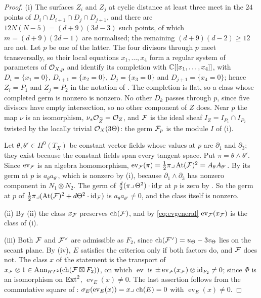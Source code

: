 \begin{proof}
(i) The surfaces $Z_{i}$ and $Z_{j}$ at cyclic distance at least three meet
in the $24$ points of $D_{i}\cap D_{i+1}\cap D_{j}\cap D_{j+1}$, and there are
$12N(N-5)=(d+9)(3d-3)$ such points, of which $m=(d+9)(2d-1)$ are normalised;
the remaining $(d+9)(d-2)\ge12$ are not. Let $p$ be one of the latter. The
four divisors through $p$ meet transversally, so their local equations
$x_{1},\dots,x_{4}$ form a regular system of parameters of $\mathcal{O}_{X,p}$ and
identify its completion with $\mathbb{C}[[x_{1},\dots,x_{4}]]$, with
$D_{i}=\{x_{1}=0\}$, $D_{i+1}=\{x_{2}=0\}$, $D_{j}=\{x_{3}=0\}$ and
$D_{j+1}=\{x_{4}=0\}$; hence $Z_{i}=P_{1}$ and $Z_{j}=P_{2}$ in the
notation of . The completion is flat, so a class
whose completed germ is nonzero is nonzero. No other $D_{k}$ passes through
$p$, since five divisors have empty intersection, so no other component of
$Z$ does. Near $p$ the map $\nu$ is an isomorphism,
$\nu_{*}\mathcal{O}_{\widetilde Z}=\mathcal{O}_{Z}$, and $\mathcal{F}$ is the ideal sheaf
$I_{Z}=I_{P_{1}}\cap I_{P_{2}}$ twisted by the locally trivial $\mathcal{O}_{X}(3\Theta)$:
the germ $\mathcal{F}_{p}$ is the module $I$ of (i).

Let $\theta,\theta'\in H^{0}(T_{X})$ be constant vector fields whose values
at $p$ are $\partial_{1}$ and $\partial_{3}$; they exist because the constant
fields span every tangent space. Put $\pi=\theta\wedge\theta'$. Since
$\operatorname{ev}_{\mathcal{F}}$ is an algebra homomorphism,
$\operatorname{ev}_{\mathcal{F}}(\pi)=\tfrac12\pi\lrcorner\,\mathrm{At}(\mathcal{F})^{2}
=A_{\theta}A_{\theta'}$. By  its germ at $p$ is
$a_{\theta}a_{\theta'}$, which is nonzero by (i),
because $\partial_{1}\wedge\partial_{3}$ has nonzero component in
$N_{1}\otimes N_{2}$. The germ of
$\tfrac d2(\pi\lrcorner\,\Theta^{2})\cdot\operatorname{id}_{\mathcal{F}}$ at $p$ is zero by
. So the germ at $p$ of
$\tfrac12\pi\lrcorner(\mathrm{At}(\mathcal{F})^{2}+d\Theta^{2}\cdot\operatorname{id}_{\mathcal{F}})$ is
$a_{\theta}a_{\theta'}\ne0$, and the class itself is nonzero.

(ii) By (ii) the class $x_{\mathcal{F}}$ preserves $\operatorname{ch}(\mathcal{F})$, and by
\eqref{eq:evgeneral} $\operatorname{ev}_{\mathcal{F}}(x_{\mathcal{F}})$ is the class of (i).

(iii) Both $\mathcal{F}$ and $\mathcal{F}^{\vee}$ are admissible as $F_{2}$, since
$\operatorname{ch}(\mathcal{F}^{\vee})=u_{\Theta}-3v_{\Theta}$ lies on the secant plane. By
(iv), $E$ satisfies the criterion only if both factors do,
and $\mathcal{F}$ does not. The class $x$ of the statement is the transport of
$x_{\mathcal{F}}\otimes1\in\operatorname{Ann}_{HT^{2}}(\operatorname{ch}(\mathcal{F}\boxtimes F_{2}))$, on which
$\operatorname{ev}$ is $\pm\operatorname{ev}_{\mathcal{F}}(x_{\mathcal{F}})\otimes\operatorname{id}_{F_{2}}\ne0$;
since $\Phi$ is an isomorphism on $\operatorname{Ext}^{2}$, $\operatorname{ev}_{E}(x)\ne0$.
The last assertion follows from the commutative square of
: $\sigma_{E}(\operatorname{ev}_{E}(x))=x\lrcorner\,\operatorname{ch}(E)=0$
with $\operatorname{ev}_{E}(x)\ne0$.
\end{proof}

